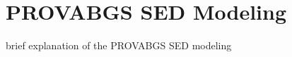 \section{PROVABGS SED Modeling} \label{sec:provabgs}

brief explanation of the PROVABGS SED modeling 
